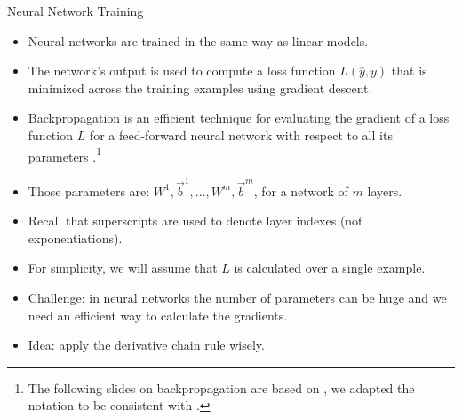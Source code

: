 \documentclass[handout]{beamer}
\begin{document}
\begin{frame}{Neural Network Training}
\begin{scriptsize}


\begin{itemize}
\item Neural networks are trained in the same way as linear models.

\item The network's output is used to compute a loss function $L(\hat{y},y)$ that is minimized across the training examples using gradient descent. 
\item Backpropagation is an efficient technique for evaluating the gradient
of a loss function $L$ for a feed-forward neural network with respect to all its parameters \cite{bishop2006pattern}.\footnote{The following slides on backpropagation are based on \cite{bishop2006pattern}, we adapted the notation to be consistent with \cite{goldberg2017neural}.}
\item Those parameters are: $W^1, \vec{b}^1, \dots, W^m, \vec{b}^m$, for a network of $m$ layers.
\item Recall that superscripts are used to denote layer indexes (not exponentiations).
\item For simplicity, we will assume that $L$ is calculated over a single example.
\item Challenge: in neural networks the number of parameters can be huge and we need an efficient way to calculate the gradients.

\item Idea: apply the derivative chain rule wisely.

\end{itemize}


\end{scriptsize}
\end{frame}
\end{document}
